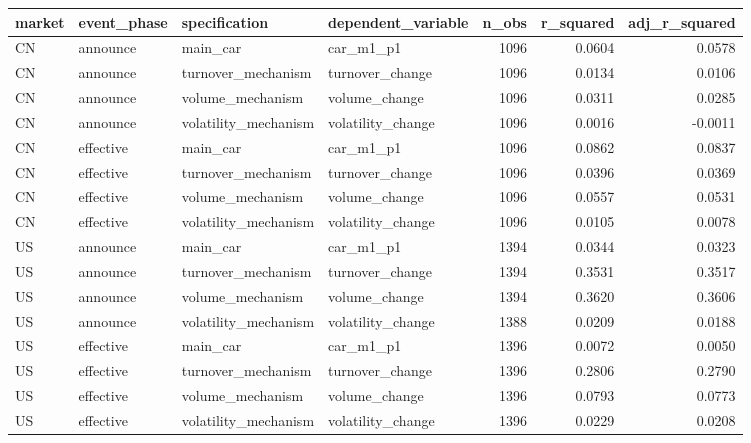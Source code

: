 \begin{tabular}{llllrrr}
\toprule
market & event_phase & specification & dependent_variable & n_obs & r_squared & adj_r_squared \\
\midrule
CN & announce & main_car & car_m1_p1 & 1096 & 0.0604 & 0.0578 \\
CN & announce & turnover_mechanism & turnover_change & 1096 & 0.0134 & 0.0106 \\
CN & announce & volume_mechanism & volume_change & 1096 & 0.0311 & 0.0285 \\
CN & announce & volatility_mechanism & volatility_change & 1096 & 0.0016 & -0.0011 \\
CN & effective & main_car & car_m1_p1 & 1096 & 0.0862 & 0.0837 \\
CN & effective & turnover_mechanism & turnover_change & 1096 & 0.0396 & 0.0369 \\
CN & effective & volume_mechanism & volume_change & 1096 & 0.0557 & 0.0531 \\
CN & effective & volatility_mechanism & volatility_change & 1096 & 0.0105 & 0.0078 \\
US & announce & main_car & car_m1_p1 & 1394 & 0.0344 & 0.0323 \\
US & announce & turnover_mechanism & turnover_change & 1394 & 0.3531 & 0.3517 \\
US & announce & volume_mechanism & volume_change & 1394 & 0.3620 & 0.3606 \\
US & announce & volatility_mechanism & volatility_change & 1388 & 0.0209 & 0.0188 \\
US & effective & main_car & car_m1_p1 & 1396 & 0.0072 & 0.0050 \\
US & effective & turnover_mechanism & turnover_change & 1396 & 0.2806 & 0.2790 \\
US & effective & volume_mechanism & volume_change & 1396 & 0.0793 & 0.0773 \\
US & effective & volatility_mechanism & volatility_change & 1396 & 0.0229 & 0.0208 \\
\bottomrule
\end{tabular}
